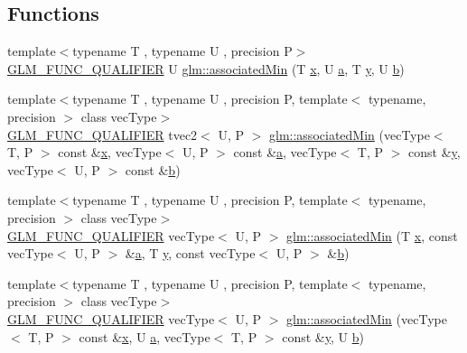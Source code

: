 \subsection*{Functions}
\begin{DoxyCompactItemize}
\item 
{\footnotesize template$<$typename T , typename U , precision P$>$ }\\\mbox{\hyperlink{setup_8hpp_a33fdea6f91c5f834105f7415e2a64407}{G\+L\+M\+\_\+\+F\+U\+N\+C\+\_\+\+Q\+U\+A\+L\+I\+F\+I\+ER}} U \mbox{\hyperlink{group__gtx__associated__min__max_gacc01bd272359572fc28437ae214a02df}{glm\+::associated\+Min}} (T \mbox{\hyperlink{glad_8h_a92d0386e5c19fb81ea88c9f99644ab1d}{x}}, U \mbox{\hyperlink{glad_8h_ac8729153468b5dcf13f971b21d84d4e5}{a}}, T \mbox{\hyperlink{glad_8h_a66ddd433d2cacfe27f5906b7e86faeed}{y}}, U \mbox{\hyperlink{glad_8h_a6eba317e3cf44d6d26c04a5a8f197dcb}{b}})
\item 
{\footnotesize template$<$typename T , typename U , precision P, template$<$ typename, precision $>$ class vec\+Type$>$ }\\\mbox{\hyperlink{setup_8hpp_a33fdea6f91c5f834105f7415e2a64407}{G\+L\+M\+\_\+\+F\+U\+N\+C\+\_\+\+Q\+U\+A\+L\+I\+F\+I\+ER}} tvec2$<$ U, P $>$ \mbox{\hyperlink{group__gtx__associated__min__max_ga8b538d10872626668a078e2bd495af25}{glm\+::associated\+Min}} (vec\+Type$<$ T, P $>$ const \&\mbox{\hyperlink{glad_8h_a92d0386e5c19fb81ea88c9f99644ab1d}{x}}, vec\+Type$<$ U, P $>$ const \&\mbox{\hyperlink{glad_8h_ac8729153468b5dcf13f971b21d84d4e5}{a}}, vec\+Type$<$ T, P $>$ const \&\mbox{\hyperlink{glad_8h_a66ddd433d2cacfe27f5906b7e86faeed}{y}}, vec\+Type$<$ U, P $>$ const \&\mbox{\hyperlink{glad_8h_a6eba317e3cf44d6d26c04a5a8f197dcb}{b}})
\item 
{\footnotesize template$<$typename T , typename U , precision P, template$<$ typename, precision $>$ class vec\+Type$>$ }\\\mbox{\hyperlink{setup_8hpp_a33fdea6f91c5f834105f7415e2a64407}{G\+L\+M\+\_\+\+F\+U\+N\+C\+\_\+\+Q\+U\+A\+L\+I\+F\+I\+ER}} vec\+Type$<$ U, P $>$ \mbox{\hyperlink{group__gtx__associated__min__max_ga1dccff48fa5650c746533de83467da6e}{glm\+::associated\+Min}} (T \mbox{\hyperlink{glad_8h_a92d0386e5c19fb81ea88c9f99644ab1d}{x}}, const vec\+Type$<$ U, P $>$ \&\mbox{\hyperlink{glad_8h_ac8729153468b5dcf13f971b21d84d4e5}{a}}, T \mbox{\hyperlink{glad_8h_a66ddd433d2cacfe27f5906b7e86faeed}{y}}, const vec\+Type$<$ U, P $>$ \&\mbox{\hyperlink{glad_8h_a6eba317e3cf44d6d26c04a5a8f197dcb}{b}})
\item 
{\footnotesize template$<$typename T , typename U , precision P, template$<$ typename, precision $>$ class vec\+Type$>$ }\\\mbox{\hyperlink{setup_8hpp_a33fdea6f91c5f834105f7415e2a64407}{G\+L\+M\+\_\+\+F\+U\+N\+C\+\_\+\+Q\+U\+A\+L\+I\+F\+I\+ER}} vec\+Type$<$ U, P $>$ \mbox{\hyperlink{group__gtx__associated__min__max_ga076717f4e07c6ae725cc1382d1ac4869}{glm\+::associated\+Min}} (vec\+Type$<$ T, P $>$ const \&\mbox{\hyperlink{glad_8h_a92d0386e5c19fb81ea88c9f99644ab1d}{x}}, U \mbox{\hyperlink{glad_8h_ac8729153468b5dcf13f971b21d84d4e5}{a}}, vec\+Type$<$ T, P $>$ const \&\mbox{\hyperlink{glad_8h_a66ddd433d2cacfe27f5906b7e86faeed}{y}}, U \mbox{\hyperlink{glad_8h_a6eba317e3cf44d6d26c04a5a8f197dcb}{b}})

\end{DoxyCompactItemize}
